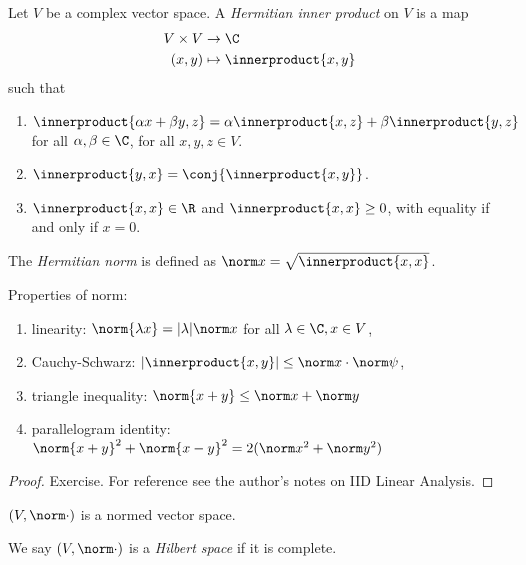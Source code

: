 \documentclass[a4paper]{article}
\newcommand*{\ip}{\innerproduct} %
\begin{document}
\begin{definition}
  Let \(V\) be a complex vector space. A \emph{Hermitian inner product} on \(V\) is a map
  \begin{align*}
    V \times V &\to \C \\
    (x, y) &\mapsto \ip{x, y}
  \end{align*}
  such that
  \begin{enumerate}
  \item \(\ip{\alpha x + \beta y, z} = \alpha \ip{x, z} + \beta \ip{y, z}\) for all \(\alpha, \beta \in \C\), for all \(x, y, z \in V\).
  \item \(\ip{y, x} = \conj{\ip{x, y}}\).
  \item \(\ip{x, x} \in \R\) and \(\ip{x, x} \geq 0\), with equality if and only if \(x = 0\).
  \end{enumerate}
\end{definition}

\begin{definition}
  The \emph{Hermitian norm} is defined as \(\norm x = \sqrt{\ip{x, x}}\).
\end{definition}

\begin{lemma}
  Properties of norm:
  \begin{enumerate}
  \item linearity: \(\norm{\lambda x} = |\lambda| \norm x\) for all \(\lambda \in \C, x \in V\),
  \item Cauchy-Schwarz: \(|\ip{x, y}| \leq \norm x \cdot \norm \psi\),
  \item triangle inequality: \(\norm{x + y} \leq \norm x + \norm y\)
  \item parallelogram identity: \(\norm{x + y}^2 + \norm{x - y}^2 = 2(\norm x^2 + \norm y^2)\)
  \end{enumerate}
\end{lemma}

\begin{proof}
  Exercise. For reference see the author's notes on IID Linear Analysis.
\end{proof}

\begin{corollary}
  \((V, \norm \cdot)\) is a normed vector space.
\end{corollary}

\begin{definition}
  We say \((V, \norm \cdot)\) is a \emph{Hilbert space} if it is complete.
\end{definition}
\end{document}
